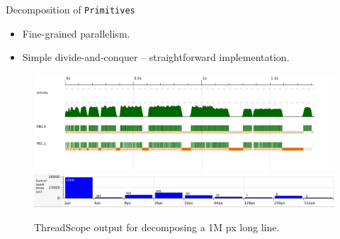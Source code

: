 \documentclass[slidestop,compress,mathserif, xcolor=table]{beamer}
\begin{document}
\begin{frame}[c]{Decomposition of \texttt{Primitives}}
  \begin{itemize}
  \item Fine-grained parallelism.
  \item Simple divide-and-conquer -- straightforward implementation.
  \end{itemize}
  \begin{figure}[h!]
    \centering
    \includegraphics[width=0.7\linewidth]{../threadscope/lines/single-line-every-10}\\
    \includegraphics[width=0.7\linewidth]{../threadscope/lines/single-line-every-10-spark-times}
    \caption{ThreadScope output for decomposing a 1M px long line.}
  \label{fig:line-thread-sparks}

\end{figure}
\end{frame}
\end{document}
